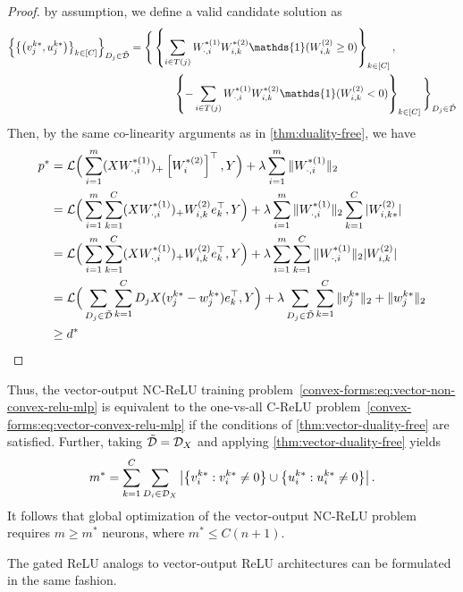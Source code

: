 \begin{proof}
    by assumption, we define a valid candidate solution as
    \begin{align*}
        \cbr{\cbr{\rbr{v_j^{k*}, u_j^{k*}}}_{k \in [C]}}_{D_j \in \tilde \calD}
        &= \Bigg\{ \cbr{\sum_{i \in T(j)} W^{*(1)}_{\cdot, i} W^{*(2)}_{i, k} \mathds{1}(W^{(2)}_{i, k} \geq 0)}_{k \in [C]},\\
        & \hspace{4em} \cbr{-\sum_{i \in T(j)} W^{*(1)}_{\cdot, i} W^{*(2)}_{i, k} \mathds{1}(W^{(2)}_{i, k} < 0)}_{k \in [C]} \Bigg\}_{D_j \in \tilde \calD}
    \end{align*}
    Then, by the same co-linearity arguments as in \cref{thm:duality-free}, we have
    \begin{align*}
        p^* & =  \mathcal{L}\Big(\sum_{i=1}^m (XW^{*(1)}_{\cdot, i})_+ \left[W^{*(2)}_{i}\right]^{\top}, Y\Big) + \lambda \sum_{i = 1}^{m}  \|W^{*(1)}_{\cdot, i}\|_2                                                        \\
            & = \mathcal{L}\Big(\sum_{i=1}^m \sum_{k=1}^C (XW^{*(1)}_{\cdot, i})_+ W^{(2)}_{i, k}e_k^\top, Y\Big) + \lambda \sum_{i = 1}^{m}  \|W^{*(1)}_{\cdot, i}\|_2 \sum_{k=1}^C |W^{(2)}_{i, k*}|       \\
            & = \mathcal{L}\Big(\sum_{i=1}^m \sum_{k=1}^C (XW^{*(1)}_{\cdot, i})_+ W^{(2)}_{i, k}e_k^\top, Y\Big) + \lambda \sum_{i = 1}^{m} \sum_{k=1}^C \|W^{*(1)}_{\cdot, i}\|_2  |W^{(2)}_{i, k}|       \\
            & = \mathcal{L}\Big(\sum_{D_j \in \tilde {\mathcal{D}}} \sum_{k=1}^C D_jX(v_{j}^{k*}- w_{j}^{k*})e_k^\top, Y\Big) + \lambda \sum_{D_j \in \tilde {\mathcal{D}}} \sum_{k=1}^C \|v_{j}^{k*}\|_2 + \|w_{j}^{k*}\|_2 \\
            & \geq d^*
    \end{align*}
\end{proof}
Thus, the vector-output NC-ReLU training problem~\eqref{convex-forms:eq:vector-non-convex-relu-mlp} is equivalent to the one-vs-all C-ReLU problem~\eqref{convex-forms:eq:vector-convex-relu-mlp} if the conditions of \cref{thm:vector-duality-free} are satisfied.
Further, taking \(\tilde {\mathcal{D}} = \mathcal{D}_X\) and applying \cref{thm:vector-duality-free} yields
\begin{equation*}
    {m}^{*} = \sum_{k=1}^C \sum_{D_i \in \mathcal{D}_X} \left\vert \left\{v^{k*}_i : v^{k*}_i \neq 0\right\} \cup \left\{u^{k*}_i : u^{k*}_i \neq 0\right\} \right\vert.
\end{equation*}
It follows that global optimization of the vector-output NC-ReLU problem requires \(m \geq m^*\) neurons, where \(m^* \leq C(n+1)\).

The gated ReLU analogs to vector-output ReLU architectures can be formulated in the same fashion.
